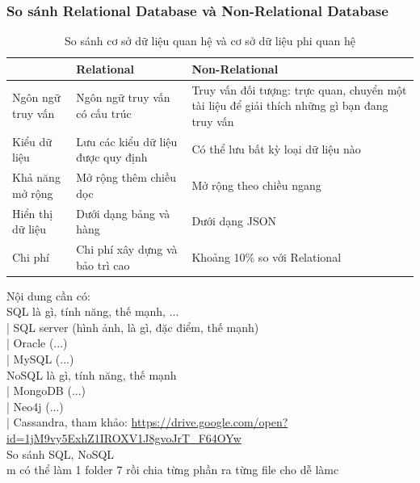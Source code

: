 \subsubsection{So sánh Relational Database và Non-Relational Database}
\begin{table}[!h]
	    \centering
	    \begin{tabular}{|p{3cm}|p{6cm}|p{6cm}|}
	        \hline
	        &\textbf{Relational}&\textbf{Non-Relational}\\
	        \hline
	        Ngôn ngữ truy vấn&Ngôn ngữ truy vấn có cấu trúc &Truy vấn đối tượng: trực quan, chuyển một tài liệu để giải thích những gì bạn đang truy vấn\\
	        \hline
	        Kiểu dữ liệu&Lưu các kiểu dữ liệu được quy định&Có thể lưu bất kỳ loại dữ liệu nào\\
	        \hline
	        Khả năng mở rộng&Mở rộng thêm chiều dọc&Mở rộng theo chiều ngang\\
	        \hline
	        Hiển thị dữ liệu&Dưới dạng bảng và hàng&Dưới dạng JSON\\
	        \hline
	        Chi phí&Chi phí xây dựng và bảo trì cao&Khoảng 10\% so với Relational\\
	        \hline
	    \end{tabular}
	    \caption{So sánh cơ sở dữ liệu quan hệ và cơ sở dữ liệu phi quan hệ}
	\end{table}
	
	
Nội dung cần có:\\
SQL là gì, tính năng, thế mạnh, ...\\
|    SQL server (hình ảnh, là gì, đặc điểm, thế mạnh)\\
|    Oracle     (...)\\
|    MySQL      (...)\\
NoSQL là gì, tính năng, thế mạnh\\
|    MongoDB    (...)\\
|    Neo4j      (...)\\
|    Cassandra, tham khảo: \url{https://drive.google.com/open?id=1jM9vy5ExhZ1IROXV1J8gvoJrT_F64OYw}\\
So sánh SQL, NoSQL\\
m có thể làm 1 folder 7 rồi chia từng phần ra từng file cho dễ làmc